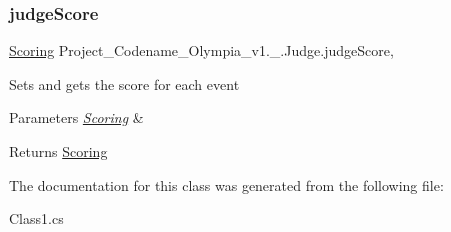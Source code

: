 \subsubsection{\texorpdfstring{judge\+Score}{judgeScore}}
{\footnotesize\ttfamily \hyperlink{classProject__Codename__Olympia__v1_1_1__0_1_1Scoring}{Scoring} Project\+\_\+\+Codename\+\_\+\+Olympia\+\_\+v1.\+\_.\+Judge.\+judge\+Score\hspace{0.3cm}{\ttfamily [get]}, {\ttfamily [set]}}

Sets and gets the score for each event 
\begin{DoxyParams}{Parameters}
{\em \hyperlink{classProject__Codename__Olympia__v1_1_1__0_1_1Scoring}{Scoring}} & \\
\hline
\end{DoxyParams}
\begin{DoxyReturn}{Returns}
\hyperlink{classProject__Codename__Olympia__v1_1_1__0_1_1Scoring}{Scoring} 
\end{DoxyReturn}


The documentation for this class was generated from the following file\+:\begin{DoxyCompactItemize}
\item 
Class1.\+cs\end{DoxyCompactItemize}
